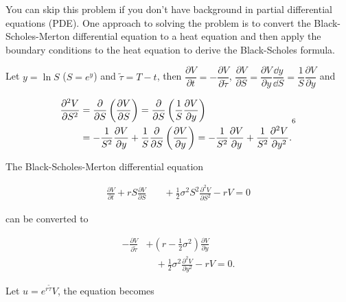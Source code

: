 
\begin{solution}
You can skip this problem if you don't have background in partial differential equations
(PDE). One approach to solving the problem is to convert the Black-Scholes-Merton
differential equation to a heat equation and then apply the boundary conditions to the heat
equation to derive the Black-Scholes formula.

Let $y=\ln S$ ($S=e^y$) and $\tilde{\tau}=T-t$, then
$\dfrac{\partial V}{\partial t}=-\dfrac{\partial V}{\partial\tilde{\tau}}$,
$\dfrac{\partial V}{\partial S}=\dfrac{\partial V}{\partial y}\dfrac{\dd y}{\dd S}
=\dfrac{1}{S}\dfrac{\partial V}{\partial y}$ and

\[
\begin{aligned}
\frac{\partial^2V}{\partial S^2}
&=\frac{\partial}{\partial S}\left(\frac{\partial V}{\partial S}\right)
=\frac{\partial}{\partial S}\left(\frac{1}{S}\frac{\partial V}{\partial y}\right)\\
&=-\frac{1}{S^2}\frac{\partial V}{\partial y}
+\frac{1}{S}\frac{\partial}{\partial S}\left(\frac{\partial V}{\partial y}\right)
=-\frac{1}{S^2}\frac{\partial V}{\partial y}
+\frac{1}{S^2}\frac{\partial^2V}{\partial y^2}.
\end{aligned}\footnotemark[6]
\]


The Black-Scholes-Merton differential equation

\[
\begin{aligned}
\frac{\partial V}{\partial t}+rS\frac{\partial V}{\partial S}
&\quad+\frac{1}{2}\sigma^2S^2\frac{\partial^2V}{\partial S^2}-rV=0
\end{aligned}
\]

can be converted to

\[
\begin{aligned}
-\frac{\partial V}{\partial\tilde{\tau}}
&+\left(r-\frac{1}{2}\sigma^2\right)\frac{\partial V}{\partial y}\\
&\quad+\frac{1}{2}\sigma^2\frac{\partial^2V}{\partial y^2}-rV=0.
\end{aligned}
\]

Let $u=e^{r\tilde{\tau}}V$, the equation becomes


\end{solution}
